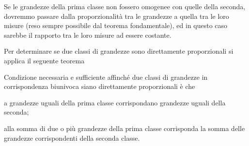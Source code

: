 Se le grandezze della prima classe non fossero omogenee con quelle della seconda, dovremmo passare dalla proporzionalità tra le grandezze a quella tra le loro misure (reso sempre possibile dal teorema fondamentale), ed in questo caso sarebbe il rapporto tra le loro misure ad essere costante.

Per determinare se due classi di grandezze sono direttamente proporzionali si applica il seguente teorema
\begin{teorema}\label{teo:6.1}
Condizione necessaria e sufficiente affinché due classi di grandezze in corrispondenza biunivoca siano direttamente proporzionali è che
\begin{itemize*}
\item a grandezze uguali della prima classe corrispondano grandezze uguali della seconda;
\item alla somma di due o più grandezze della prima classe corrisponda la somma delle grandezze corrispondenti della seconda classe.
\end{itemize*}
\end{teorema}

